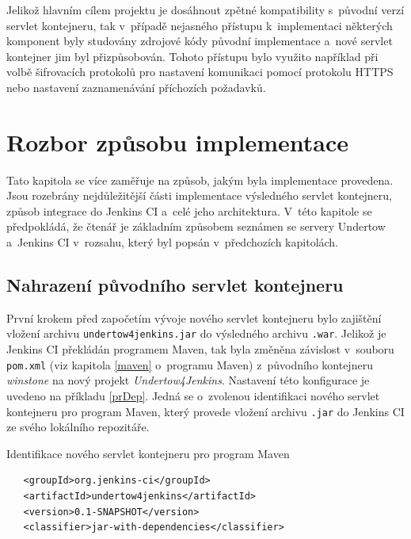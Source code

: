         \medskip
        Jelikož hlavním cílem projektu je dosáhnout zpětné kompatibility s~původní verzí servlet kontejneru,
        tak v~případě nejasného přístupu k~implementaci některých komponent byly studovány zdrojové kódy
        původní implementace a~nové servlet kontejner jim byl přizpůsobován. Tohoto přístupu bylo využito
        například při volbě šifrovacích protokolů pro nastavení komunikaci pomocí protokolu HTTPS nebo nastavení zaznamenávání
        příchozích požadavků.
        
     \section{Rozbor způsobu implementace}
        Tato kapitola se více zaměřuje na způsob, jakým byla implementace provedena. Jsou rozebrány nejdůležitější
        části implementace výsledného servlet kontejneru, způsob integrace do Jenkins CI
        a~celé jeho architektura. V~této kapitole se předpokládá, že čtenář je
        základním způsobem seznámen se servery Undertow a~Jenkins CI v~rozsahu, který byl popsán
        v~předchozích kapitolách.


        \subsection{Nahrazení původního servlet kontejneru}
            První krokem před započetím vývoje nového servlet kontejneru bylo zajištění vložení archivu \texttt{undertow4jenkins.jar} 
            do výsledného archivu \texttt{.war}.
            Jelikož je Jenkins CI překládán programem Maven, tak byla změněna závislost v~souboru \texttt{pom.xml} 
            (viz kapitola \ref{maven} o~programu Maven)
            z~původního kontejneru \emph{winstone} na nový projekt \emph{Undertow4Jenkins}.
            Nastavení této konfigurace je uvedeno na příkladu \ref{prDep}. Jedná se o~zvolenou identifikaci nového servlet
            kontejneru pro program Maven, který provede vložení archivu \texttt{.jar} do Jenkins CI ze svého lokálního repozitáře.

\begin{priklad} \label{prDep} Identifikace nového servlet kontejneru pro program Maven 
\begin{verbatim}
   <groupId>org.jenkins-ci</groupId>
   <artifactId>undertow4jenkins</artifactId>
   <version>0.1-SNAPSHOT</version>
   <classifier>jar-with-dependencies</classifier>
\end{verbatim}
\end{priklad}

